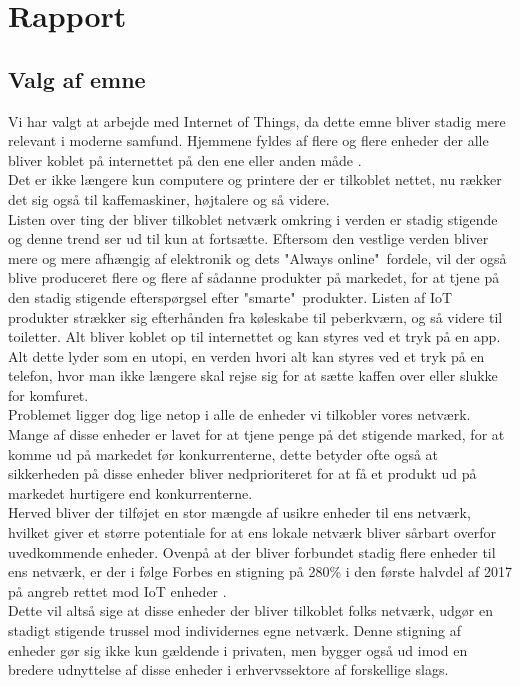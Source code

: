 
\chapter{Rapport}

    \section{Valg af emne}  %
    Vi har valgt at arbejde med Internet of Things, da dette emne bliver stadig mere relevant i moderne samfund. Hjemmene fyldes af flere og flere enheder der alle bliver koblet på internettet på den ene eller anden måde \autocite{website:Statistica2015}.\\
    Det er ikke længere kun computere og printere der er tilkoblet nettet, nu rækker det sig også til kaffemaskiner, højtalere og så videre. 
    \\
    Listen over ting der bliver tilkoblet netværk omkring i verden er stadig stigende og denne trend ser ud til kun at fortsætte. Eftersom den vestlige verden bliver mere og mere afhængig af elektronik og dets "Always online"\ fordele, vil der også blive produceret flere og flere af sådanne produkter på markedet, for at tjene på den stadig stigende efterspørgsel efter "smarte"\ produkter. Listen af IoT produkter strækker sig efterhånden fra køleskabe til peberkværn, og så videre til toiletter. Alt bliver koblet op til internettet og kan styres ved et tryk på en app. Alt dette lyder som en utopi, en verden hvori alt kan styres ved et tryk på en telefon, hvor man ikke længere skal rejse sig for at sætte kaffen over eller slukke for komfuret.\\
    Problemet ligger dog lige netop i alle de enheder vi tilkobler vores netværk. Mange af disse enheder er lavet for at tjene penge på det stigende marked, for at komme ud på markedet før konkurrenterne, dette betyder ofte også at sikkerheden på disse enheder bliver nedprioriteret for at få et produkt ud på markedet hurtigere end konkurrenterne.\\
    Herved bliver der tilføjet en stor mængde af usikre enheder til ens netværk, hvilket giver et større potentiale for at ens lokale netværk bliver sårbart overfor uvedkommende enheder. Ovenpå at der bliver forbundet stadig flere enheder til ens netværk, er der i følge Forbes en stigning på 280\% i den første halvdel af 2017 på angreb rettet mod IoT enheder \autocite{Techrepublic}.\\
    Dette vil altså sige at disse enheder der bliver tilkoblet folks netværk, udgør en stadigt stigende trussel mod individernes egne netværk. Denne stigning af enheder gør sig ikke kun gældende i privaten, men bygger også ud imod en bredere udnyttelse af disse enheder i erhvervssektore af forskellige slags.
    

